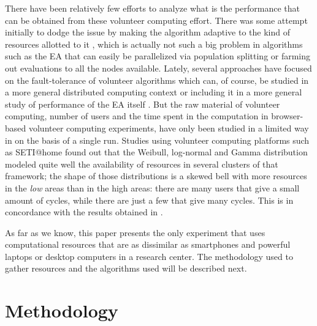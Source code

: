 \documentclass{sig-alternate}
\begin{document}
There have been relatively few efforts to analyze what is the
performance that can be obtained from these volunteer computing
effort. There was some attempt initially to dodge the issue by making
the algorithm adaptive to the kind of resources allotted to it
\cite{milani2004online}, which is actually not such a big problem in
algorithms such as the EA that can easily be
parallelized via population splitting or farming out evaluations to all
the nodes available. Lately, several approaches have focused on the
fault-tolerance of volunteer algorithms
\cite{gonzalez2010characterizing} which can, of course, be studied in
a more general distributed computing context
\cite{nogueras2015studying} or including it in a more general study of
performance of the EA itself %
\cite{DBLP:journals/gpem/LaredoBGVAGF14}. But the raw material of
volunteer computing, number of users and the time spent in the
computation in browser-based volunteer computing experiments, have only been studied in a limited way in
\cite{DBLP:journals/gpem/LaredoBGVAGF14} on the basis of a single
run. Studies using volunteer computing platforms such as SETI@home
\cite{javadi2009mining} found out that the Weibull, log-normal and Gamma distribution
modeled quite well the availability of resources in several clusters
of that framework; the shape of those distributions is a skewed bell
with more resources in the {\em low} areas than in the high areas:
there are many users that give a small amount of cycles, while there
are just a few that give many cycles. This is in concordance with the
results obtained in \cite{agajaj}.

As far as we know, this paper presents the only experiment that uses computational
resources that are as dissimilar as smartphones and powerful laptops
or desktop computers in a research center. The methodology used to
gather resources and the algorithms used will be described next. 


\section{Methodology}
\label{sec:exp}
\end{document}
